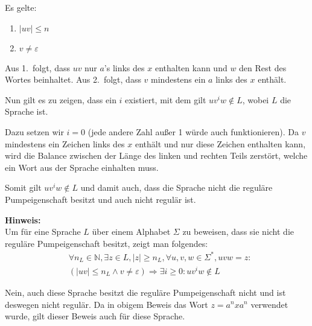 \begin{aufgabe}
\begin{teile}
    Es gelte:
    \begin{enumerate}
        \item $\vert uv\vert \leq n$
        \item $v \not= \varepsilon$
    \end{enumerate}
    Aus 1.\ folgt, dass $uv$ nur $a$'s links des $x$ enthalten kann und $w$ den Rest des Wortes beinhaltet.
    Aus 2.\ folgt, dass $v$ mindestens ein $a$ links des $x$ enthält.

    Nun gilt es zu zeigen, dass ein $i$ existiert, mit dem gilt $u v^i w \not\in L$, wobei $L$ die Sprache ist.
    
    Dazu setzen wir $i = 0$ (jede andere Zahl außer 1 würde auch funktionieren).
    Da $v$ mindestens ein Zeichen links des $x$ enthält und nur diese Zeichen enthalten kann, wird die Balance zwischen der Länge des linken und rechten Teils zerstört, welche ein Wort aus der Sprache einhalten muss.

    Somit gilt $u v^i w \not\in L$ und damit auch, dass die Sprache nicht die reguläre Pumpeigenschaft besitzt und auch nicht regulär ist.

    \textbf{Hinweis:}
    \\Um für eine Sprache $L$ über einem Alphabet $\Sigma$ zu beweisen, dass sie nicht die reguläre Pumpeigenschaft besitzt, zeigt man folgendes:
    \begin{align*}
        &\forall n_L \in \mathbb{N}, \exists z \in L, \vert z \vert \geq n_L, \forall u,v,w \in \Sigma^*, uvw = z:\\
        & (\vert uv \vert \leq n_L \land v \not= \varepsilon) \Rightarrow \exists i \geq 0: u v^i w \not\in L 
    \end{align*}
    \item Nein, auch diese Sprache besitzt die reguläre Pumpeigenschaft nicht und ist deswegen nicht regulär.
    Da in obigem Beweis das Wort $z = a^n x a^n$ verwendet wurde, gilt dieser Beweis auch für diese Sprache.
\end{teile}

\end{aufgabe} %
